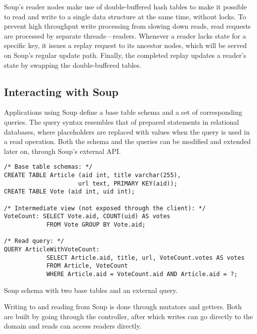 Soup's reader nodes make use of double-buffered hash tables to make it possible
to read and write to a single data structure at the same time, without locks. To
prevent high throughput write processing from slowing down reads, read requests
are processed by separate threads---readers. Whenever a reader lacks state for a
specific key, it issues a replay request to its ancestor nodes, which will be
served on Soup's regular update path. Finally, the completed replay updates a
reader's state by swapping the double-buffered tables.

\subsection{Interacting with Soup}

Applications using Soup define a base table schema and a set of corresponding
queries. The query syntax resembles that of prepared statements in relational
databases, where placeholders are replaced with values when the query is used in
a read operation. Both the schema and the queries can be modified and extended
later on, through Soup's external API.\@

\begin{listing}[H]
  \begin{verbatim}
/* Base table schemas: */
CREATE TABLE Article (aid int, title varchar(255),
                     url text, PRIMARY KEY(aid));
CREATE TABLE Vote (aid int, uid int);

/* Intermediate view (not exposed through the client): */
VoteCount: SELECT Vote.aid, COUNT(uid) AS votes
            FROM Vote GROUP BY Vote.aid;

/* Read query: */
QUERY ArticleWithVoteCount:
            SELECT Article.aid, title, url, VoteCount.votes AS votes
            FROM Article, VoteCount
            WHERE Article.aid = VoteCount.aid AND Article.aid = ?;
  \end{verbatim}
  \caption{Soup schema with two base tables and an external query.}\label{lst:soup-schema}
\end{listing}

Writing to and reading from Soup is done through mutators and getters. Both are
built by going through the controller, after which writes can go directly to the
domain and reads can access readers directly.

